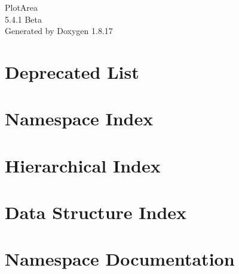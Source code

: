 \let\mypdfximage\pdfximage\def\pdfximage{\immediate\mypdfximage}\documentclass[twoside]{book}
\newcommand{\+}{\discretionary{\mbox{\scriptsize$\hookleftarrow$}}{}{}}
\newcommand{\clearemptydoublepage}{%
  \newpage{\pagestyle{empty}\cleardoublepage}%
}
\begin{document}
\hypersetup{pageanchor=false,
             bookmarksnumbered=true,
             pdfencoding=unicode
            }
\begin{titlepage}
\vspace*{7cm}
\begin{center}%
{\Large Plot\+Area \\[1ex]\large 5.\+4.\+1 Beta }\\
\vspace*{1cm}
{\large Generated by Doxygen 1.8.17}\\
\end{center}
\end{titlepage}
\clearemptydoublepage
{}
\tableofcontents
\clearemptydoublepage
{}
\hypersetup{pageanchor=true}

\chapter{Deprecated List}
\label{deprecated}

\chapter{Namespace Index}

\chapter{Hierarchical Index}

\chapter{Data Structure Index}

\chapter{Namespace Documentation}



\end{document}
